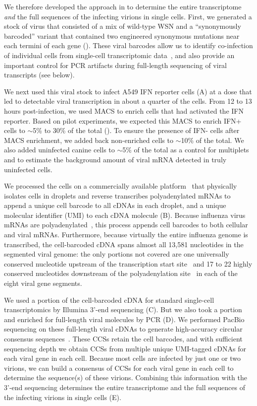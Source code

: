 \documentclass[9pt,lineno]{elife}
\begin{document}
We therefore developed the approach in  to determine the entire transcriptome \emph{and} the full sequences of the infecting virions in single cells.
First, we generated a stock of virus that consisted of a mix of wild-type WSN and a ``synonymously barcoded'' variant that contained two engineered synonymous mutations near each termini of each gene ().
These viral barcodes allow us to identify co-infection of individual cells from single-cell transcriptomic data~\citep{russell2018extreme}, and also provide an important control for PCR artifacts during full-length sequencing of viral transcripts (see below).

We next used this viral stock to infect A549 IFN reporter cells (A) at a dose that led to detectable viral transcription in about a quarter of the cells.
From 12 to 13 hours post-infection, we used MACS to enrich cells that had activated the IFN reporter.
Based on pilot experiments, we expected this MACS to enrich IFN+ cells to $\sim$5\% to 30\% of the total ().
To ensure the presence of IFN- cells after MACS enrichment, we added back non-enriched cells to $\sim$10\% of the total.
We also added uninfected canine cells to $\sim$5\% of the total as a control for multiplets and to estimate the background amount of viral mRNA detected in truly uninfected cells.

We processed the cells on a commercially available platform~\citep[the 10X Chromium;][]{zheng2017massively} that physically isolates cells in droplets and reverse transcribes polyadenylated mRNAs to append a unique cell barcode to all cDNAs in each droplet, and a unique molecular identifier (UMI) to each cDNA molecule (B).
Because influenza virus mRNAs are polyadenylated~\citep{robertson1981polyadenylation}, this process appends cell barcodes to both cellular and viral mRNAs.
Furthermore, because virtually the entire influenza genome is transcribed, the cell-barcoded cDNA spans almost all 13,581 nucleotides in the segmented viral genome: the only portions not covered are one universally conserved nucleotide upstream of the transcription start site~\citep{koppstein2015sequencing} and 17 to 22 highly conserved nucleotides downstream of the polyadenylation site~\citep{robertson1981polyadenylation} in each of the eight viral gene segments.

We used a portion of the cell-barcoded cDNA for standard single-cell transcriptomics by Illumina 3'-end sequencing (C).
But we also took a portion and enriched for full-length viral molecules by PCR (D).
We performed PacBio sequencing on these full-length viral cDNAs to generate high-accuracy circular consensus sequences~\citep[CCSs;][]{travers2010flexible}.
These CCSs retain the cell barcodes, and with sufficient sequencing depth we obtain CCSs from multiple unique UMI-tagged cDNAs for each viral gene in each cell.
Because most cells are infected by just one or two virions, we can build a consensus of CCSs for each viral gene in each cell to determine the sequence(s) of these virions.
Combining this information with the 3'-end sequencing determines the entire transcriptome and the full sequences of the infecting virions in single cells (E).
\end{document}
